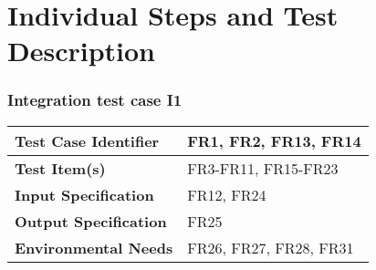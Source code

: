 \section{Individual Steps and Test Description} %
\label{sec:individual_steps_and_test_description}


\subsubsection{Integration test case I1} %
\label{ssub:integration_test_case_i1}

\begin{tabularx}{\textwidth}{X|X}

\hline

\textbf{Test Case Identifier}          & FR1,  FR2, FR13, FR14                 \\ \hline
\textbf{Test Item(s)}                  & FR3-FR11, FR15-FR23                   \\ \hline
\textbf{Input Specification}           & FR12, FR24                            \\ \hline
\textbf{Output Specification}          & FR25                                  \\ \hline
\textbf{Environmental Needs}           & FR26, FR27, FR28, FR31                \\ \hline

\end{tabularx}
